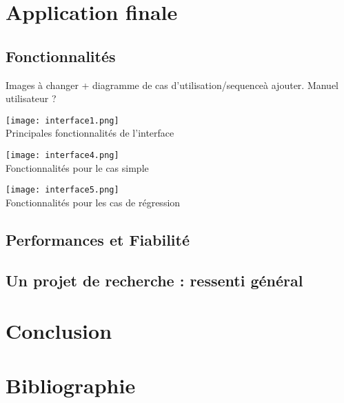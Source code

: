 \documentclass[a4paper,11pt]{article}
\begin{document}
\section{Application finale}
\subsection{Fonctionnalités}
Images à changer + diagramme de cas d'utilisation/sequenceà ajouter. Manuel utilisateur ?
\begin{center}
\texttt{[image: interface1.png]}\\
Principales fonctionnalités de l'interface\\[2.5 cm]
\end{center}
\begin{center}
\texttt{[image: interface4.png]}\\
Fonctionnalités pour le cas simple\\[2.5 cm]
\end{center}
\begin{center}
\texttt{[image: interface5.png]}\\
Fonctionnalités pour les cas de régression
\end{center}
\subsection{Performances et Fiabilité}
\subsection{Un projet de recherche : ressenti général}

\section{Conclusion}


\section{Bibliographie}
\end{document}
